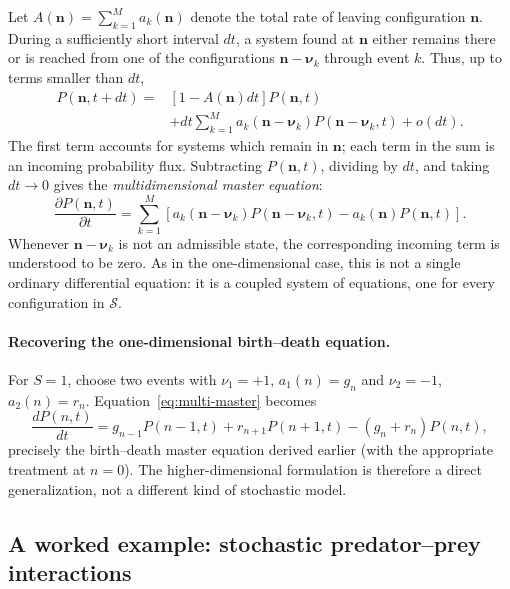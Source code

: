Let $A(\mathbf n)=\sum_{k=1}^M a_k(\mathbf n)$ denote the total rate of
leaving configuration $\mathbf n$. During a sufficiently short interval
$dt$, a system found at $\mathbf n$ either remains there or is reached from
one of the configurations $\mathbf n-\boldsymbol\nu_k$ through event $k$.
Thus, up to terms smaller than $dt$,
\begin{align}
 P(\mathbf n,t+dt)={}&
   [1-A(\mathbf n)dt]P(\mathbf n,t) \nonumber\\
 &+dt\sum_{k=1}^{M}
       a_k(\mathbf n-\boldsymbol\nu_k)
       P(\mathbf n-\boldsymbol\nu_k,t)+o(dt).
 \label{eq:multi-bookkeeping}
\end{align}
The first term accounts for systems which remain in $\mathbf n$; each term
in the sum is an incoming probability flux. Subtracting $P(\mathbf n,t)$,
dividing by $dt$, and taking $dt\to0$ gives the \emph{multidimensional
master equation}:
\begin{equation}
 \boxed{\displaystyle
 \frac{\partial P(\mathbf n,t)}{\partial t}
 =\sum_{k=1}^{M}\left[
    a_k(\mathbf n-\boldsymbol\nu_k)
    P(\mathbf n-\boldsymbol\nu_k,t)
    -a_k(\mathbf n)P(\mathbf n,t)
  \right].}
 \label{eq:multi-master}
\end{equation}
Whenever $\mathbf n-\boldsymbol\nu_k$ is not an admissible state, the
corresponding incoming term is understood to be zero. As in the
one-dimensional case, this is not a single ordinary differential equation:
it is a coupled system of equations, one for every configuration in
$\mathcal S$.

\paragraph{Recovering the one-dimensional birth--death equation.}
For $S=1$, choose two events with
$\nu_1=+1$, $a_1(n)=g_n$ and $\nu_2=-1$,
$a_2(n)=r_n$. Equation~\eqref{eq:multi-master} becomes
\begin{equation}
 \frac{dP(n,t)}{dt}
 =g_{n-1}P(n-1,t)+r_{n+1}P(n+1,t)
  -(g_n+r_n)P(n,t),
 \label{eq:multi-recovery}
\end{equation}
precisely the birth--death master equation derived earlier (with the
appropriate treatment at $n=0$). The higher-dimensional formulation is
therefore a direct generalization, not a different kind of stochastic model.

\subsection{A worked example: stochastic predator--prey interactions}
\label{subsec:multi-predator-prey}

